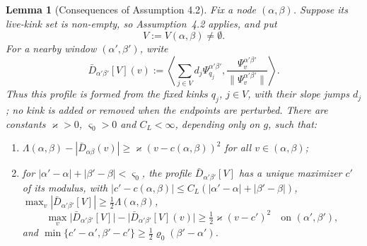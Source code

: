 \documentclass[12pt, a4paper]{article}
\newtheorem{lemma}{Lemma}[section]
\newcommand{\assnondeg}{Assumption~4.2}
\begin{document}
\begin{lemma}[Consequences of Assumption 4.2]
\label{lem:conseq}
Fix a node $(\alpha,\beta)$. Suppose its live-kink set is non-empty, so
\assnondeg{} applies, and put
\[
V:=V(\alpha,\beta)\ne\emptyset.
\]
For a nearby window $(\alpha',\beta')$, write
\[
\bar D_{\alpha'\beta'}[V](v):=
\left\langle \sum_{j\in V}d_j\Psi^{\alpha'\beta'}_{q_j},
\frac{\Psi^{\alpha'\beta'}_v}{\|\Psi^{\alpha'\beta'}_v\|}\right\rangle .
\]
Thus this profile is formed from the fixed kinks $q_j$, $j\in V$, with their
slope jumps $d_j$; no kink is added or removed when the endpoints are
perturbed. There are constants
$\varkappa>0$, $\varsigma_0>0$ and $C_L<\infty$, depending only on $g$, such
that:
\begin{enumerate}
\item[\emph{(a)}] $\Lambda(\alpha,\beta) - |\bar D_{\alpha\beta}(v)| \ge
\varkappa (v - c(\alpha,\beta))^2$ for all $v \in (\alpha,\beta)$;
\item[\emph{(b)}] for $|\alpha'-\alpha| + |\beta'-\beta| < \varsigma_0$, the
profile $\bar D_{\alpha'\beta'}[V]$ has a unique maximizer $c'$ of its modulus,
with $|c' - c(\alpha,\beta)| \le C_L(|\alpha'-\alpha| + |\beta'-\beta|)$,
$\max_v |\bar D_{\alpha'\beta'}[V]| \ge \tfrac12\Lambda(\alpha,\beta)$,
\[
\max_v \big|\bar D_{\alpha'\beta'}[V]\big| -
\big|\bar D_{\alpha'\beta'}[V](v)\big| \ge \tfrac12 \varkappa (v-c')^2
\quad\text{on } (\alpha',\beta'),
\]
and $\min\{c'-\alpha', \beta'-c'\} \ge \tfrac12 \varrho_0(\beta'-\alpha')$.
\end{enumerate}
\end{lemma}
\end{document}
